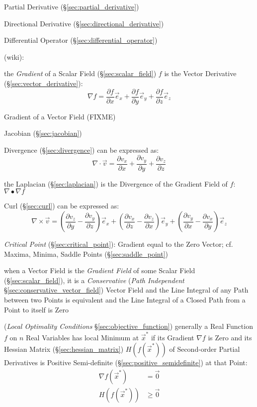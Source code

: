 Partial Derivative (\S\ref{sec:partial_derivative})

Directional Derivative (\S\ref{sec:directional_derivative})

Differential Operator (\S\ref{sec:differential_operator})

(wiki):

the \emph{Gradient} of a Scalar Field (\S\ref{sec:scalar_field}) $f$ is the
Vector Derivative (\S\ref{sec:vector_derivative}):
\[
  \nabla f =
    \frac{\partial f}{\partial x}\vec{e}_x +
    \frac{\partial f}{\partial y}\vec{e}_y +
    \frac{\partial f}{\partial z}\vec{e}_z
\]

Gradient of a Vector Field (FIXME)

Jacobian (\S\ref{sec:jacobian})

Divergence (\S\ref{sec:divergence}) can be expressed as:
\[
  \nabla \cdot \vec{v} =
    \frac{\partial v_x}{\partial x} +
    \frac{\partial v_y}{\partial y} +
    \frac{\partial v_z}{\partial z}
\]

the Laplacian (\S\ref{sec:laplacian}) is the Divergence of the Gradient Field
of $f$: $\nabla \bullet \nabla f$

Curl (\S\ref{sec:curl}) can be expressed as:
\[
  \nabla\times\vec{v} =
    (\frac{\partial v_z}{\partial y}-\frac{\partial v_y}{\partial z})\vec{e}_x +
    (\frac{\partial v_x}{\partial z}-\frac{\partial v_z}{\partial x})\vec{e}_y +
    (\frac{\partial v_y}{\partial x}-\frac{\partial v_x}{\partial y})\vec{e}_z
\]

\emph{Critical Point} (\S\ref{sec:critical_point}): Gradient equal to the Zero
Vector; cf. Maxima, Minima, Saddle Points (\S\ref{sec:saddle_point})

when a Vector Field is the \emph{Gradient Field} of some Scalar Field
(\S\ref{sec:scalar_field}), it is a \emph{Conservative} (\emph{Path
  Independent} \S\ref{sec:conservative_vector_field}) Vector Field and the Line
Integral of any Path between two Points is equivalent and the Line Integral of
a Closed Path from a Point to itself is Zero

(\emph{Local Optimality Conditions} \S\ref{sec:objective_function}) generally a
Real Function $f$ on $n$ Real Variables has local Minimum at $\vec{x}^*$ if its
Gradient $\nabla f$ is Zero and its Hessian Matrix (\S\ref{sec:hessian_matrix})
$H(f(\vec{x}^*))$ of Second-order Partial Derivatives is Positive Semi-definite
(\S\ref{sec:positive_semidefinite}) at that Point:
\begin{align*}
  \nabla f(\vec{x}^*) & =    \vec{0} \\
  H(f(\vec{x}^*))     & \geq \vec{0} \\
\end{align*}



